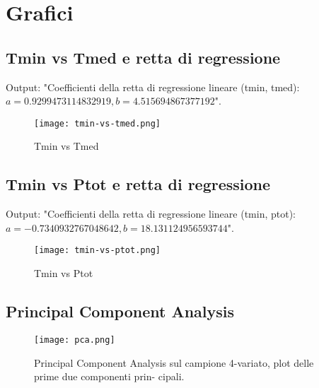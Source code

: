 \documentclass[a4paper]{report}
\begin{document}
\newpage

\section{Grafici}

\subsection{Tmin vs Tmed e retta di regressione}

Output: "Coefficienti della retta di regressione lineare (tmin, tmed): \(a = 0.9299473114832919, b = 4.515694867377192\)".

\begin{figure}[h]
    \centering
    \texttt{[image: tmin-vs-tmed.png]}
    \caption{Tmin vs Tmed}
    \label{fig:enter-label}
\end{figure}

\newpage

\subsection{Tmin vs Ptot e retta di regressione}

Output: "Coefficienti della retta di regressione lineare (tmin, ptot): \(a = -0.7340932767048642, b = 18.131124956593744\)".

\begin{figure}[h]
    \centering
    \texttt{[image: tmin-vs-ptot.png]}
    \caption{Tmin vs Ptot}
    \label{fig:enter-label}
\end{figure}

\newpage

\subsection{Principal Component Analysis}

\begin{figure}[h]
    \centering
    \texttt{[image: pca.png]}
    \caption{Principal Component Analysis sul campione 4-variato, plot delle prime due componenti prin-
cipali.}
    \label{fig:enter-label}
\end{figure}
\end{document}
